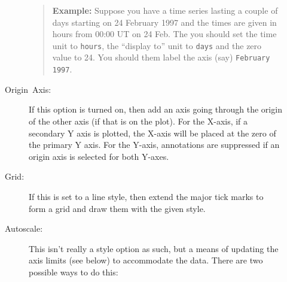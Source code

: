 \documentclass[11pt,twoside,english]{article}
\begin{document}
\begin{description}
\begin{description}
\begin{quote}
  \textsf{\textbf{Example:}} \textsf{Suppose you have a time series
    lasting a couple of days starting on 24 February 1997 and the times
    are given in hours from 00:00 UT on 24 Feb. The you should set the
    time unit to} \texttt{hours}\textsf{, the {}``display to'' unit to}
  \texttt{days} \textsf{and the zero value to 24. You should them label
    the axis (say)} \texttt{February 1997}\textsf{.}
\end{quote}
\item [Origin~Axis:]If this option is turned on, then add an
  axis going through the origin of the other axis (if that is on the
  plot). For the X-axis, if a secondary Y axis is plotted, the X-axis
  will be placed at the zero of the primary Y axis. For the
  Y-axis, annotations are suppressed if an origin axis is selected for
  both Y-axes.
\item [Grid:]If this is set to a line style, then extend the major tick
  marks to form a grid and draw them with the given style.
\item [Autoscale:]This isn't really a style option as such, but a means
  of updating the axis limits (see below) to accommodate the
  data. There are two possible ways to do this:


\end{description}
\end{description}
\end{document}
